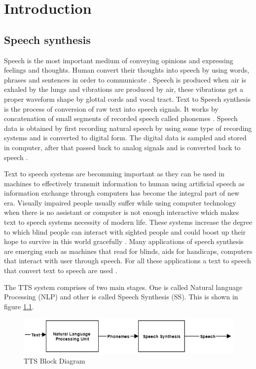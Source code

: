 \chapter{Introduction}

\section{Speech synthesis}

Speech is the most important medium of conveying opinions and expressing feelings and thoughts.
Human convert their thoughts into speech by using words, phrases and sentences in order to communicate \cite{mumtaz2016break}. 
Speech is produced when air is exhaled by the lungs and vibrations are produced by air, these vibrations get a 
proper waveform shape by glottal cords and vocal tract. Text to Speech synthesis is the process of conversion of raw text into 
speech signals. It works by concatenation of small segments of recorded speech called phonemes \cite{khilari2015review}. Speech data is obtained by first recording natural speech by using some type of recording systems and is converted to digital form. The digital data is sampled and stored in computer, after that passed back to analog signals and is converted back to speech \cite{greene1986perception}. 

Text to speech systems are becomming important as they can be used in machines to effectively transmit
information to human using artificial speech as information exchange through computers has become the integral part of new
era. Visually impaired people usually suffer while using computer technology when there is no assistant or
computer is not enough interactive which makes text to speech systems necessity of modern life. These
systems increase the degree to which blind people can interact with sighted people \cite{klatt1987review} and could boost up
their hope to survive in this world gracefully \cite{aida2010main}. Many applications of speech synthesis are emerging such as 
machines that read for blinds, aids for handicaps, computers that interact with user through speech. 
For all these applications a text to speech that convert text to speech are used \cite{klatt1982klattalk}.

The TTS system comprises of two main stages. One is called Natural language Processing (NLP) and
other is called Speech Synthesis (SS). This is shown in figure \ref{fig:TTS Block Diagram}.

\begin{figure}
  \centering
  \includegraphics[width=\linewidth]{images/tts_bd.jpg}
  \caption{TTS Block Diagram}
  \label{fig:TTS Block Diagram}
\end{figure}

